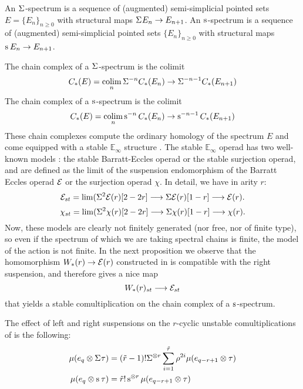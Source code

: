 An $\Sigma^{}$-spectrum is a sequence of (augmented) semi-simplicial pointed sets $E = \{E_n\}_{n\geq 0}$ with structural maps $\Sigma^{} E_n\to E_{n+1}$. An $\operatorname{s}^{}$-spectrum is a sequence of (augmented) semi-simplicial pointed sets $\{E_n\}_{n\geq 0}$ with structural maps $\operatorname{s}^{} E_n\to E_{n+1}$.

The chain complex of a $\Sigma^{}$-spectrum is the colimit
\[
    C_*(E) = \operatorname*{colim}_n \Sigma^{-n} C_*(E_n)\to \Sigma^{-n-1} C_*(E_{n+1})
\]
The chain complex of a $\operatorname{s}^{}$-spectrum is the colimit
\[
    C_*(E) = \operatorname*{colim}_n \operatorname{s}^{-n} C_*(E_n)\to \operatorname{s}^{-n-1} C_*(E_{n+1})
\]
These chain complexes compute the ordinary homology of the spectrum $E$ and come equipped with a stable $\mathbb{E}_\infty$ structure \cite{Gill2020}. The stable $\mathbb{E}_\infty$ operad has two well-known models \cite[Appendix]{berger2004combinatorial}: the stable Barratt-Eccles operad or the stable surjection operad, and are defined as the limit of the suspension endomorphism of the Barratt Eccles operad $\mathcal{E}$ or the surjection operad $\chi$. In detail, we have in arity $r$:
\[\mathcal{E}_{st} = \lim(  \Sigma^2\mathcal{E}(r)[2-2r] \longrightarrow \Sigma \mathcal{E}(r)[1-r]\longrightarrow \mathcal{E}(r).\]
\[\chi_{st} = \lim(  \Sigma^2\chi(r)[2-2r] \longrightarrow \Sigma \chi(r)[1-r]\longrightarrow \chi(r).\]
Now, these models are clearly not finitely generated (nor free, nor of finite type), so even if the spectrum of which we are taking spectral chains is finite, the model of the action is not finite. In the next proposition we observe that the homomorphism $W_*(r)\to \mathcal{E}(r)$ constructed in \cite{medina2021may_st} is compatible with the right suspension, and therefore gives a nice map
\[
    W_*(r)_{st}\longrightarrow \mathcal{E}_{st}
\]
that yields a stable comultiplication on the chain complex of a $\operatorname{s}^{}$-spectrum.

\begin{proposition}\label{prop:suspensionunstable}
    The effect of left and right suspensions on the $r$-cyclic unstable comultiplications of \cite{medina2021may_st} is the following:
    \begin{align*}
        \mu(e_q\otimes \Sigma^{} \tau) &= (\tilde{r}-1)!\Sigma^{\otimes r}\sum_{i=1}^{\tilde{r}} \rho^{2i}\mu(e_{q-r+1}\otimes \tau)
        \\
       \mu(e_q\otimes \operatorname{s}^{}\tau) &= \tilde{r}!\operatorname{s}^{\otimes r}\mu(e_{q-r+1}\otimes \tau)
    \end{align*}
\end{proposition}

